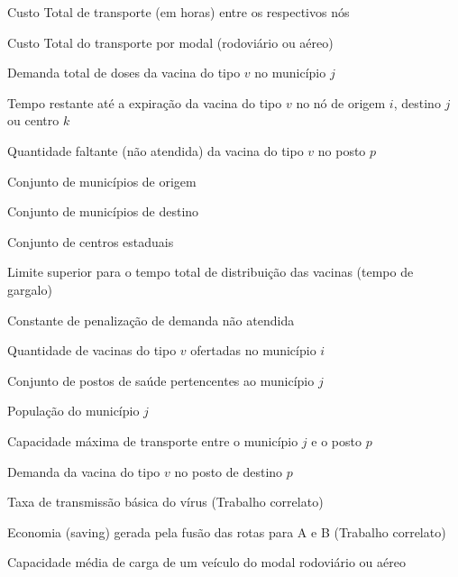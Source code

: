 
\begin{simbolos}
\item[$C_{ij}, C_{ik}, C_{kj}, C_{jp}$] Custo Total de transporte (em horas) entre os respectivos nós
\item[$C_{ij}^{rod}, C_{ij}^{aereo}$] Custo Total do transporte por modal (rodoviário ou aéreo)
\item[$d_{jv}$] Demanda total de doses da vacina do tipo $v$ no município $j$
\item[$e_{iv}, e_{jv}, e_{kv}$] Tempo restante até a expiração da vacina do tipo $v$ no nó de origem $i$, destino $j$ ou centro $k$
\item[$f_{pv}$] Quantidade faltante (não atendida) da vacina do tipo $v$ no posto $p$
\item[$I$] Conjunto de municípios de origem
\item[$J$] Conjunto de municípios de destino
\item[$K$] Conjunto de centros estaduais
\item[$L$] Limite superior para o tempo total de distribuição das vacinas (tempo de gargalo)
\item[$M$] Constante de penalização de demanda não atendida
\item[$o_{iv}$] Quantidade de vacinas do tipo $v$ ofertadas no município $i$
\item[$P_j$] Conjunto de postos de saúde pertencentes ao município $j$
\item[$Pop_j$] População do município $j$
\item[$q_{jp}$] Capacidade máxima de transporte entre o município $j$ e o posto $p$
\item[$r_{pv}$] Demanda da vacina do tipo $v$ no posto de destino $p$
\item[$R_0$] Taxa de transmissão básica do vírus (Trabalho correlato)
\item[$S_{AB}$] Economia (saving) gerada pela fusão das rotas para A e B (Trabalho correlato)
\item[$U^{rod}, U^{aereo}$] Capacidade média de carga de um veículo do modal rodoviário ou aéreo

\end{simbolos}

